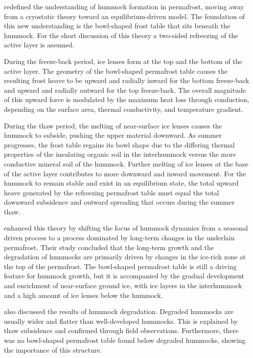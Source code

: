 \citet{mackayOriginHummocksWestern1980} redefined the understanding of hummock formation in permafrost, moving away from a cryostatic theory toward an equilibrium-driven model. 
The foundation of this new understanding is the bowl-shaped frost table that sits beneath the hummock. 
For the short discussion of this theory a two-sided refreezing of the active layer is assumed.

During the freeze-back period, ice lenses form at the top and the bottom of the active layer. 
The geometry of the bowl-shaped permafrost table causes the resulting frost heave to be upward and radially inward for the bottom freeze-back and upward and radially outward for the top freeze-back. 
The overall magnitude of this upward force is modulated by the maximum heat loss through conduction, depending on the surface area, thermal conductivity, and temperature gradient.

During the thaw period, the melting of near-surface ice lenses causes the hummock to subside, pushing the upper material downward. 
As summer progresses, the frost table regains its bowl shape due to the differing thermal properties of the insulating organic soil in the interhummock versus the more conductive mineral soil of the hummock. 
Further melting of ice lenses at the base of the active layer contributes to more downward and inward movement. 
For the hummock to remain stable and exist in an equilibrium state, the total upward heave generated by the refreezing permafrost table must equal the total downward subsidence and outward spreading that occurs during the summer thaw.

\citet{kokeljStructureDynamicsEarth2007} enhanced this theory by shifting the focus of hummock dynamics from a seasonal driven process to a process dominated by long-term changes in the underlain permafrost. 
Their study concluded that the long-term growth and the degradation of hummocks are primarily driven by changes in the ice-rich zone at the top of the permafrost. 
The bowl-shaped permafrost table is still a driving feature for hummock growth, but it is accompanied by the gradual development and enrichment of near-surface ground ice, with ice layers in the interhummock and a high amount of ice lenses below the hummock. 

\citet{kokeljStructureDynamicsEarth2007} also discussed the results of hummock degradation. 
Degraded hummocks are usually wider and flatter than well-developed hummocks. 
This is explained by thaw subsidence and confirmed through field observations. 
Furthermore, there was no bowl-shaped permafrost table found below degraded hummocks, showing the importance of this structure. 

